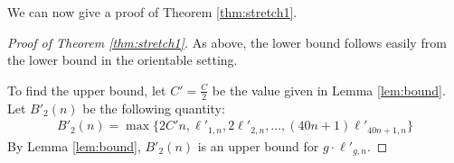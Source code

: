 We can now give a proof of Theorem \ref{thm:stretch1}.

\begin{proof}[Proof of Theorem \ref{thm:stretch1}]
As above, the lower bound follows easily from the lower bound in the orientable setting.  %
  
  To find the upper bound, let $C'=\frac{C}{2}$ be the value given in Lemma \ref{lem:bound}. Let $B'_2(n)$ be the
  following quantity:
  \begin{align*}
    B'_2(n) = \max\{2C'n, \ell'_{1,n}, 2\ell'_{2,n}, \dots, (40n + 1)\ell'_{40n+1,n}\}
  \end{align*}
  By Lemma \ref{lem:bound}, $B'_2(n)$ is an upper bound for $g\cdot \ell'_{g,n}$.
\end{proof}